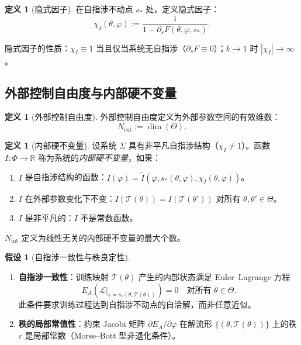 \documentclass[12pt,a4paper]{article}
\theoremstyle{definition}
\newtheorem{definition}[theorem]{定义}
\newtheorem{assumption}[theorem]{假设}
\newcommand{\mL}{\mathcal{L}}
\newcommand{\mT}{\mathcal{T}}
\newcommand{\mPhi}{\Phi}
\newcommand{\mTheta}{\Theta}
\newcommand{\R}{\mathbb{R}}
\newcommand{\chiI}{\chi_I}
\newcommand{\Nint}{N_{\mathrm{int}}}
\newcommand{\Next}{N_{\mathrm{ext}}}
\begin{document}
\begin{definition}[隐式因子]
\label{def:chi}
在自指涉不动点 $s_*$ 处，定义隐式因子：
\begin{equation}
\label{eq:chi}
\chiI(\theta, \varphi) := \frac{1}{1 - \partial_s F(\theta, \varphi, s_*)}.
\end{equation}
\end{definition}

隐式因子的性质：$\chiI \equiv 1$ 当且仅当系统无自指涉（$\partial_s F \equiv 0$）；$k \to 1$ 时 $|\chiI| \to \infty$。

\subsection{外部控制自由度与内部硬不变量}

\begin{definition}[外部控制自由度]
\label{def:next}
外部控制自由度定义为外部参数空间的有效维数：
\begin{equation}
\Next := \dim(\mTheta).
\end{equation}
\end{definition}

\begin{definition}[内部硬不变量]
\label{def:nint}
设系统 $\Sigma$ 具有非平凡自指涉结构（$\chiI \neq 1$）。函数 $I: \mPhi \to \R$ 称为系统的\emph{内部硬不变量}，如果：
\begin{enumerate}[label=(INV-\arabic*)]
\item $I$ 是自指涉结构的函数：$I(\varphi) = \tilde{I}(\varphi, s_*(\theta, \varphi), \chiI(\theta, \varphi))$。
\item $I$ 在外部参数变化下不变：$I(\mT(\theta)) = I(\mT(\theta'))$ 对所有 $\theta, \theta' \in \mTheta$。
\item $I$ 是非平凡的：$I$ 不是常数函数。
\end{enumerate}
$\Nint$ 定义为线性无关的内部硬不变量的最大个数。
\end{definition}

\begin{assumption}[自指涉一致性与秩良定性]
\label{ass:a5}
\begin{enumerate}[label=(A5-\arabic*)]
\item \textbf{自指涉一致性}：训练映射 $\mT(\theta)$ 产生的内部状态满足 Euler--Lagrange 方程
\[ E_A(\mL|_{s = s_*(\theta, \mT(\theta))}) = 0 \quad \text{对所有 } \theta \in \mTheta. \]
此条件要求训练过程达到自指涉不动点的自洽解，而非任意近似。
\item \textbf{秩的局部常值性}：约束 Jacobi 矩阵 $\partial E_A / \partial \varphi$ 在解流形 $\{(\theta, \mT(\theta))\}$ 上的秩 $r$ 是局部常数（Morse--Bott 型非退化条件）。
\end{enumerate}
\end{assumption}
\end{document}
